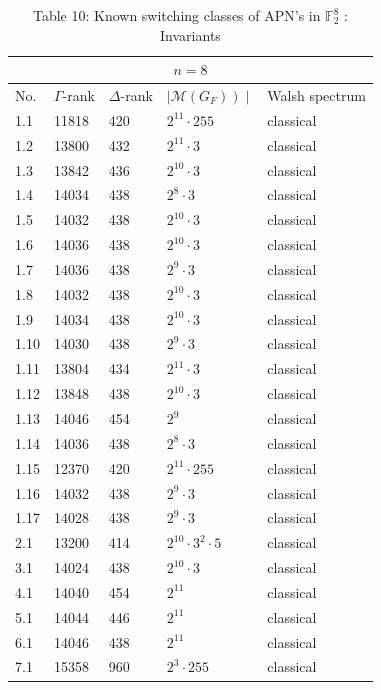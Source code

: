 \documentclass[10pt]{article}
\begin{document}
\begin{table}[h]
\begin{center}
\begin{tabular}{|l|l|l|l|l|}
\hline
\multicolumn{5}{|c|}{$n=8$} \\
\hline
No. & $\Gamma$-rank & $\Delta$-rank & $\left.\mid \mathcal{M}\left(G_{F}\right)\right) \mid$ & Walsh spectrum \\
\hline
1.1 & 11818 & 420 & $2^{11} \cdot 255$ & classical \\
\hline
1.2 & 13800 & 432 & $2^{11} \cdot 3$ & classical \\
\hline
1.3 & 13842 & 436 & $2^{10} \cdot 3$ & classical \\
\hline
1.4 & 14034 & 438 & $2^{8} \cdot 3$ & classical \\
\hline
1.5 & 14032 & 438 & $2^{10} \cdot 3$ & classical \\
\hline
1.6 & 14036 & 438 & $2^{10} \cdot 3$ & classical \\
\hline
1.7 & 14036 & 438 & $2^{9} \cdot 3$ & classical \\
\hline
1.8 & 14032 & 438 & $2^{10} \cdot 3$ & classical \\
\hline
1.9 & 14034 & 438 & $2^{10} \cdot 3$ & classical \\
\hline
1.10 & 14030 & 438 & $2^{9} \cdot 3$ & classical \\
\hline
1.11 & 13804 & 434 & $2^{11} \cdot 3$ & classical \\
\hline
1.12 & 13848 & 438 & $2^{10} \cdot 3$ & classical \\
\hline
1.13 & 14046 & 454 & $2^{9}$ & classical \\
\hline
1.14 & 14036 & 438 & $2^{8} \cdot 3$ & classical \\
\hline
1.15 & 12370 & 420 & $2^{11} \cdot 255$ & classical \\
\hline
1.16 & 14032 & 438 & $2^{9} \cdot 3$ & classical \\
\hline
1.17 & 14028 & 438 & $2^{9} \cdot 3$ & classical \\
\hline
2.1 & 13200 & 414 & $2^{10} \cdot 3^{2} \cdot 5$ & classical \\
\hline
3.1 & 14024 & 438 & $2^{10} \cdot 3$ & classical \\
\hline
4.1 & 14040 & 454 & $2^{11}$ & classical \\
\hline
5.1 & 14044 & 446 & $2^{11}$ & classical \\
\hline
6.1 & 14046 & 438 & $2^{11}$ & classical \\
\hline
7.1 & 15358 & 960 & $2^{3} \cdot 255$ & classical \\
\hline
\end{tabular}
\captionsetup{labelformat=empty}
\caption{Table 10: Known switching classes of APN's in $\mathbb{F}_{2}^{8}$ : Invariants}
\end{center}
\end{table}
\end{document}
